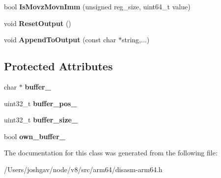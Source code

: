\begin{DoxyCompactItemize}
\item 
bool {\bfseries Is\+Movz\+Movn\+Imm} (unsigned reg\+\_\+size, uint64\+\_\+t value)\hypertarget{classv8_1_1internal_1_1_disassembling_decoder_a80c4af820aafc5a5cfd3d883b19e74d0}{}\label{classv8_1_1internal_1_1_disassembling_decoder_a80c4af820aafc5a5cfd3d883b19e74d0}

\item 
void {\bfseries Reset\+Output} ()\hypertarget{classv8_1_1internal_1_1_disassembling_decoder_a50816d92799f2cfe9d8d4bd4f2dadeee}{}\label{classv8_1_1internal_1_1_disassembling_decoder_a50816d92799f2cfe9d8d4bd4f2dadeee}

\item 
void {\bfseries Append\+To\+Output} (const char $\ast$string,...)\hypertarget{classv8_1_1internal_1_1_disassembling_decoder_a53e28ce1dfbe2ee8677b137296db00ad}{}\label{classv8_1_1internal_1_1_disassembling_decoder_a53e28ce1dfbe2ee8677b137296db00ad}

\end{DoxyCompactItemize}
\subsection*{Protected Attributes}
\begin{DoxyCompactItemize}
\item 
char $\ast$ {\bfseries buffer\+\_\+}\hypertarget{classv8_1_1internal_1_1_disassembling_decoder_a674151a3ce441ae0e7dd86a74dfaea70}{}\label{classv8_1_1internal_1_1_disassembling_decoder_a674151a3ce441ae0e7dd86a74dfaea70}

\item 
uint32\+\_\+t {\bfseries buffer\+\_\+pos\+\_\+}\hypertarget{classv8_1_1internal_1_1_disassembling_decoder_a6498fd77a7c27db7497bd1040b9cc2bf}{}\label{classv8_1_1internal_1_1_disassembling_decoder_a6498fd77a7c27db7497bd1040b9cc2bf}

\item 
uint32\+\_\+t {\bfseries buffer\+\_\+size\+\_\+}\hypertarget{classv8_1_1internal_1_1_disassembling_decoder_a64bd8e30232bef0346f867155fc21ac3}{}\label{classv8_1_1internal_1_1_disassembling_decoder_a64bd8e30232bef0346f867155fc21ac3}

\item 
bool {\bfseries own\+\_\+buffer\+\_\+}\hypertarget{classv8_1_1internal_1_1_disassembling_decoder_a819d9421c7e5779d6b2768330e62ea76}{}\label{classv8_1_1internal_1_1_disassembling_decoder_a819d9421c7e5779d6b2768330e62ea76}

\end{DoxyCompactItemize}


The documentation for this class was generated from the following file\+:\begin{DoxyCompactItemize}
\item 
/\+Users/joshgav/node/v8/src/arm64/disasm-\/arm64.\+h\end{DoxyCompactItemize}
